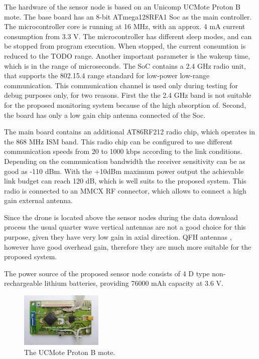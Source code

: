 \documentclass[conference]{IEEEtran}
\begin{document}
The hardware of the sensor node is based on an Unicomp UCMote Proton B mote.
The base board has an 8-bit ATmega128RFA1 Soc as the main controller. The
microcontroller core is running at 16 MHz, with an approx. 4 mA current
consumption from 3.3 V. The microcontroller has different sleep modes,
and can be stopped from program execution. When stopped, the current consumtion
is reduced to the TODO range. Another important parameter is the wakeup time,
which is in the range of microseconds. The SoC contains a 2.4 GHz radio unit,
that supports the 802.15.4 range standard for low-power low-range communication.
This communication channel is used only during testing for debug purposes only,
for two reasons. First the the 2.4 GHz band is not suitable for the proposed
monitoring system because of the high absorption of. Second, the board has
only a low gain chip antenna connected of the Soc.

The main board contains an additional AT86RF212 radio chip, which operates in
the 868 MHz ISM band. This radio chip can be configured to use different
communication speeds from 20 to 1000 kbps according to the link conditions.
Depending on the communication bandwidth the receiver sensitivity can be as good as
-110 dBm. With the +10dBm maximum power output the achievable link budget can
reach 120 dB, which is well suits to the proposed system. This radio is connected to
an MMCX RF connector, which allows to connect a high gain external antenna.

Since the drone is located above the sensor nodes during the data download
process the usual quarter wave vertical antennas are not a good choice for
this purpose, given they have very low gain in axial direction. QFH antennas \cite{adams1974},
however have good overhead gain, therefore they are much more suitable for the
proposed system.

The power source of the proposed sensor node consists of 4 D type non-rechargeable
lithium batteries, providing 76000 mAh capacity at 3.6 V.

\begin{figure}[htbp]
	\centering
	\includegraphics[width=0.35\textwidth]{fig/ucproton.png}
  \caption{The UCMote Proton B mote. }
	\label{fig-proton}
\end{figure}
\end{document}
